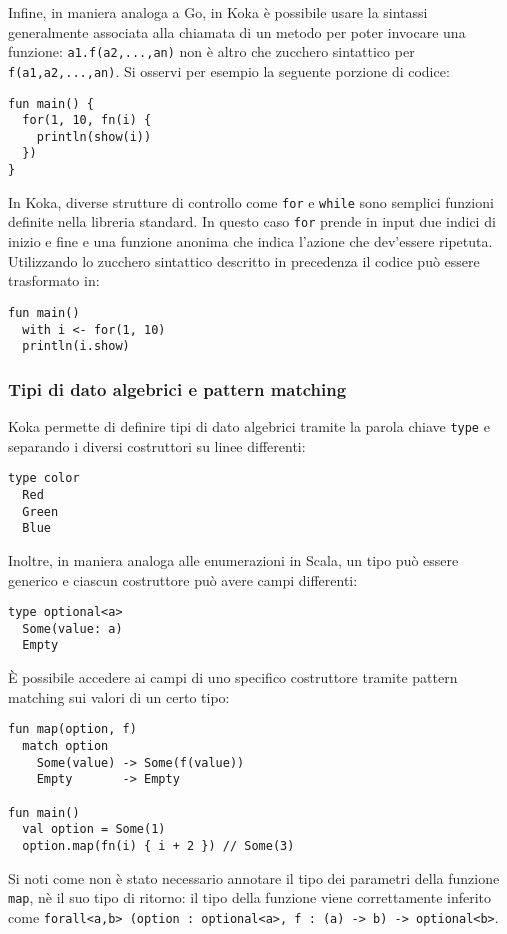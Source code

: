 Infine, in maniera analoga a Go, in Koka è possibile usare la sintassi generalmente associata alla chiamata di un metodo per poter invocare una funzione: \lstinline{a1.f(a2,...,an)} non è altro che zucchero sintattico per \lstinline{f(a1,a2,...,an)}.
Si osservi per esempio la seguente porzione di codice:
\begin{lstlisting}[language=koka]
fun main() {
  for(1, 10, fn(i) {
    println(show(i))
  })
}
\end{lstlisting}
In Koka, diverse strutture di controllo come \lstinline{for} e \lstinline{while} sono semplici funzioni definite nella libreria standard. In questo caso \lstinline{for} prende in input due indici di inizio e fine e una funzione anonima che indica l'azione che dev'essere ripetuta.
Utilizzando lo zucchero sintattico descritto in precedenza il codice può essere trasformato in:
\begin{lstlisting}[language=koka]
fun main()
  with i <- for(1, 10)
  println(i.show)
\end{lstlisting}

\subsubsection{Tipi di dato algebrici e pattern matching}
Koka permette di definire tipi di dato algebrici tramite la parola chiave \lstinline{type} e separando i diversi costruttori su linee differenti:
\begin{lstlisting}[language=koka]
type color
  Red
  Green
  Blue
\end{lstlisting}
Inoltre, in maniera analoga alle enumerazioni in Scala, un tipo può essere generico e ciascun costruttore può avere campi differenti:
\begin{lstlisting}[language=koka]
type optional<a>
  Some(value: a)
  Empty
\end{lstlisting}
È possibile accedere ai campi di uno specifico costruttore tramite pattern matching sui valori di un certo tipo:
\begin{lstlisting}[language=koka]
fun map(option, f)
  match option
    Some(value) -> Some(f(value))
    Empty       -> Empty

fun main()
  val option = Some(1)
  option.map(fn(i) { i + 2 }) // Some(3)
\end{lstlisting}
Si noti come non è stato necessario annotare il tipo dei parametri della funzione \lstinline{map}, nè il suo tipo di ritorno: il tipo della funzione viene correttamente inferito come \lstinline{forall<a,b> (option : optional<a>, f : (a) -> b) -> optional<b>}.

